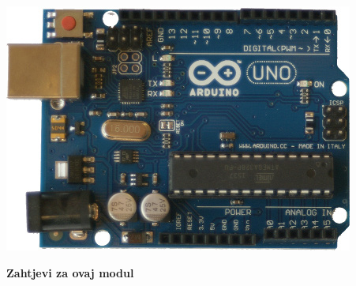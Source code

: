 \documentclass{arduino}
\begin{document}
\includegraphics[width=\linewidth]{1. Arduino}

\textbf{Zahtjevi za ovaj modul}
\end{document}

